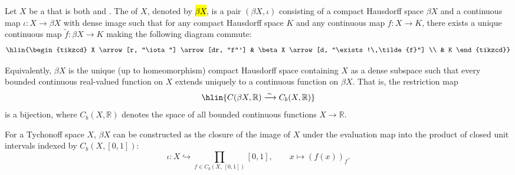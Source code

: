 \begin{definition} \label{definition:stone_cech_compactification_of_a_topological_space}
    Let $X$ be a  that is both  and . The  of $X$, denoted by \hl{$\beta X$}, is a pair $(\beta X, \iota)$ consisting of a compact Hausdorff space $\beta X$ and a continuous map $\iota : X \to \beta X$ with dense image such that for any compact Hausdorff space $K$ and any continuous map $f : X \to K$, there exists a unique continuous map $\tilde{f} : \beta X \to K$ making the following diagram commute:
    $$\hlin{\begin{tikzcd}
        X \arrow[r, "\iota"] \arrow[dr, "f"'] & \beta X \arrow[d, "\exists!\,\tilde{f}"] \\
        & K
    \end{tikzcd}}$$

    Equivalently, $\beta X$ is the unique (up to homeomorphism) compact Hausdorff space containing $X$ as a dense subspace such that every bounded continuous real-valued function on $X$ extends uniquely to a continuous function on $\beta X$. That is, the restriction map
    $$\hlin{C(\beta X, \mathbb{R}) \xrightarrow{\,\sim\,} C_b(X, \mathbb{R})}$$
    is a bijection, where $C_b(X, \mathbb{R})$ denotes the space of all bounded continuous functions $X \to \mathbb{R}$.

    For a Tychonoff space $X$, $\beta X$ can be constructed as the closure of the image of $X$ under the evaluation map into the product of closed unit intervals indexed by $C_b(X, [0,1])$:
    $$\iota : X \hookrightarrow \prod_{f \in C_b(X,\,[0,1])} [0,1], \qquad x \mapsto (f(x))_{f}.$$
\end{definition}

